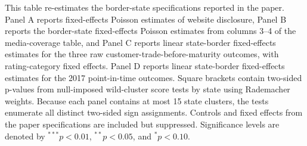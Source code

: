 \clearpage
\begin{table}[H]\centering
\def\sym#1{\ifmmode^{#1}\else\(^{#1}\)\fi}
\begingroup
\caption{\textbf{Wild Cluster Bootstrap Inference for Border-State Tests}}
\label{tab:wild_cluster_bootstrap_border_tests}
\parbox{\textwidth}{This table re-estimates the border-state specifications reported in the paper. Panel A reports fixed-effects Poisson estimates of website disclosure, Panel B reports the border-state fixed-effects Poisson estimates from columns 3--4 of the media-coverage table, and Panel C reports linear state-border fixed-effects estimates for the three raw customer-trade-before-maturity outcomes, with rating-category fixed effects. Panel D reports linear state-border fixed-effects estimates for the 2017 point-in-time outcomes. Square brackets contain two-sided p-values from null-imposed wild-cluster score tests by state using Rademacher weights. Because each panel contains at most 15 state clusters, the tests enumerate all distinct two-sided sign assignments. Controls and fixed effects from the paper specifications are included but suppressed. Significance levels are denoted by $^{***}p<0.01$, $^{**}p<0.05$, and $^{*}p<0.10$.}
\endgroup
\end{table}


